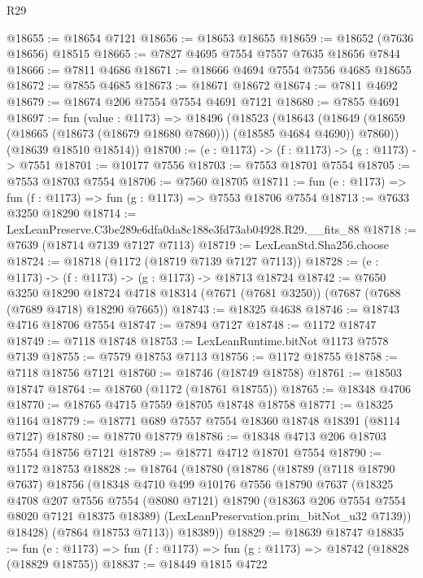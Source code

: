\begin{lexlean}{R29}
\begin{coremodule}
@18655 := @18654 @7121
@18656 := @18653 @18655
@18659 := @18652 (@7636 @18656) @18515
@18665 := @7827 @4695 @7554 @7557 @7635 @18656 @7844
@18666 := @7811 @4686
@18671 := @18666 @4694 @7554 @7556 @4685 @18655
@18672 := @7855 @4685
@18673 := @18671 @18672
@18674 := @7811 @4692
@18679 := @18674 @206 @7554 @7554 @4691 @7121
@18680 := @7855 @4691
@18697 := fun (value : @1173) =>
  @18496
    (@18523
      (@18643 (@18649 (@18659 (@18665 (@18673 (@18679 @18680 @7860))) (@18585 @4684 @4690)) @7860))
      (@18639 @18510 @18514))
@18700 := (e : @1173) -> (f : @1173) -> (g : @1173) -> @7551
@18701 := @10177 @7556
@18703 := @7553 @18701 @7554
@18705 := @7553 @18703 @7554
@18706 := @7560 @18705
@18711 := fun (e : @1173) => fun (f : @1173) => fun (g : @1173) => @7553 @18706 @7554
@18713 := @7633 @3250 @18290
@18714 := LexLeanPreserve.C3be289e6dfa0da8c188e3fd73ab04928.R29.__fits_88
@18718 := @7639 (@18714 @7139 @7127 @7113)
@18719 := LexLeanStd.Sha256.choose
@18724 := @18718 (@1172 (@18719 @7139 @7127 @7113))
@18728 := (e : @1173) -> (f : @1173) -> (g : @1173) -> @18713 @18724
@18742 := @7650
    @3250
    @18290
    @18724
    @4718
    @18314
    (@7671 (@7681 @3250))
    (@7687 (@7688 (@7689 @4718) @18290 @7665))
@18743 := @18325 @4638
@18746 := @18743 @4716 @18706 @7554
@18747 := @7894 @7127
@18748 := @1172 @18747
@18749 := @7118 @18748
@18753 := LexLeanRuntime.bitNot @1173 @7578 @7139
@18755 := @7579 @18753 @7113
@18756 := @1172 @18755
@18758 := @7118 @18756 @7121
@18760 := @18746 (@18749 @18758)
@18761 := @18503 @18747
@18764 := @18760 (@1172 (@18761 @18755))
@18765 := @18348 @4706
@18770 := @18765 @4715 @7559 @18705 @18748 @18758
@18771 := @18325 @1164
@18779 := @18771 @689 @7557 @7554 @18360 @18748 @18391 (@8114 @7127)
@18780 := @18770 @18779
@18786 := @18348 @4713 @206 @18703 @7554 @18756 @7121
@18789 := @18771 @4712 @18701 @7554
@18790 := @1172 @18753
@18828 := @18764
    (@18780
      (@18786
        (@18789
          (@7118 @18790 @7637)
          @18756
          (@18348
            @4710
            @499
            @10176
            @7556
            @18790
            @7637
            (@18325
              @4708
              @207
              @7556
              @7554
              (@8080 @7121)
              @18790
              (@18363 @206 @7554 @7554 @8020 @7121 @18375 @18389)
              (LexLeanPreservation.prim_bitNot_u32 @7139))
            @18428)
          (@7864 @18753 @7113))
        @18389))
@18829 := @18639 @18747
@18835 := fun (e : @1173) => fun (f : @1173) => fun (g : @1173) => @18742 (@18828 (@18829 @18755))
@18837 := @18449 @1815 @4722

\end{coremodule}
\end{lexlean}

